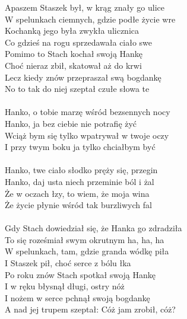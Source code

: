 \documentclass[a5paper, 10pt]{book}
\begin{document}
\begin{minipage}[t]{0.8\textwidth}
  Apaszem Staszek był, w krąg znały go ulice\\
  W spelunkach ciemnych, gdzie podłe życie wre\\
  Kochanką jego była zwykła ulicznica\\
  Co gdzieś na rogu sprzedawała ciało swe\\
  Pomimo to Stach kochał swoją Hankę\\
  Choć nieraz zbił, skatował aż do krwi\\
  Lecz kiedy znów przepraszał swą bogdankę\\
  No to tak do niej szeptał czułe słowa te\\
  \\
  \hspace*{5mm}Hanko, o tobie marzę wśród bezsennych nocy\\
  \hspace*{5mm}Hanko, ja bez ciebie nie potrafię żyć\\
  \hspace*{5mm}Wciąż bym się tylko wpatrywał w twoje oczy\\
  \hspace*{5mm}I przy twym boku ja tylko chciałbym być\\
  \\
  \hspace*{5mm}Hanko, twe ciało słodko pręży się, przegin\\
  \hspace*{5mm}Hanko, daj usta niech przeminie ból i żal\\
  \hspace*{5mm}Że w oczach łzy, to wiem, że moja wina\\
  \hspace*{5mm}Że życie płynie wśród tak burzliwych fal\\
  \\
  Gdy Stach dowiedział się, że Hanka go zdradziła\\
  To się roześmiał swym okrutnym ha, ha, ha\\
  W spelunkach, tam, gdzie granda wódkę piła\\
  I Staszek pił, choć serce z bólu łka\\
  Po roku znów Stach spotkał swoją Hankę\\
  I w ręku błysnął długi, ostry nóż\\
  I nożem w serce pchnął swoją bogdankę\\
  A nad jej trupem szeptał: Cóż jam zrobił, cóż?\\
\end{minipage}
\end{document}
